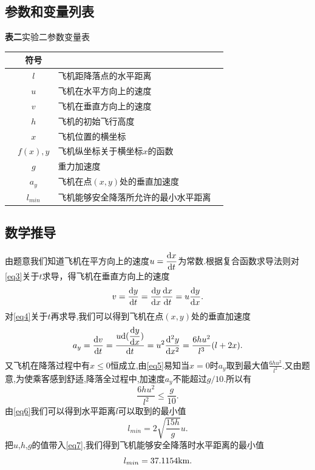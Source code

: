 \documentclass[a4paper,12pt]{article}
\begin{document}
\begin{CJK*}{UTF8}{gbsn}
\subsection{参数和变量列表}
\begin{center}
\textbf{表二}\quad 实验二参数变量表\\\vspace{2pt}
\begin{tabular}{cclc}
\toprule[1.5pt]
& 符号 & \qquad\qquad\qquad{} &\\
\midrule[1.5pt]
& $l$ & 飞机距降落点的水平距离 &\\
& $u$ & 飞机在水平方向上的速度 &\\
& $v$ & 飞机在垂直方向上的速度 &\\
& $h$ & 飞机的初始飞行高度 &\\
& $x$ & 飞机位置的横坐标 &\\
& $f(x),y$ & 飞机纵坐标关于横坐标$x$的函数 &\\
& $g$ & 重力加速度 &\\
& $a_y$ & 飞机在点$(x,y)$处的垂直加速度 &\\
& $l_{min}$ & 飞机能够安全降落所允许的最小水平距离 &\\
\bottomrule[1.5pt]
\end{tabular}
\end{center}


\subsection{数学推导}
由题意我们知道飞机在平方向上的速度$u=\displaystyle{\frac{{\rm d}x}{{\rm d}t}}$为常数.根据复合函数求导法则对\eqref{eq3}关于$t$求导，得飞机在垂直方向上的速度
\begin{equation}
v=\frac{{\rm d}y}{{\rm d}t}=\frac{{\rm d}y}{{\rm d}x}\frac{{\rm d}x}{{\rm d}t}=u\frac{{\rm d}y}{{\rm d}x}. \label{eq4}
\end{equation}
对\eqref{eq4}关于$t$再求导,我们可以得到飞机在点$(x,y)$处的垂直加速度
\begin{equation}
a_y=\frac{{\rm d}v}{{\rm d}t}=\frac{u{\rm d}(\displaystyle{\frac{{\rm d}y}{{\rm d}x})}}{{\rm d}t}=u^2\frac{{\rm d^2}y}{{\rm d}x^2}=\frac{6hu^2}{l^3}(l+2x). \label{eq5}
\end{equation}
又飞机在降落过程中有$x\leqslant0$恒成立,由\eqref{eq5}易知当$x=0$时$a_y$取到最大值$\displaystyle{\frac{6hu^2}{l^2}}$.又由题意,为使乘客感到舒适,降落全过程中,加速度$a_y$不能超过$g/10$.所以有
\begin{equation}
{\frac{6hu^2}{l^2}\leqslant\frac{g}{10}}. \label{eq6}
\end{equation}
由\eqref{eq6}我们可以得到水平距离$l$可以取到的最小值
\begin{equation}
l_{min}=2\sqrt{\frac{15h}{g}}u. \label{eq7}
\end{equation}
把$u$,$h$,$g$的值带入\eqref{eq7},我们得到飞机能够安全降落时水平距离的最小值
\begin{equation*}
l_{min}=37.1154{\rm km}.
\end{equation*}



\end{CJK*}
\end{document}
